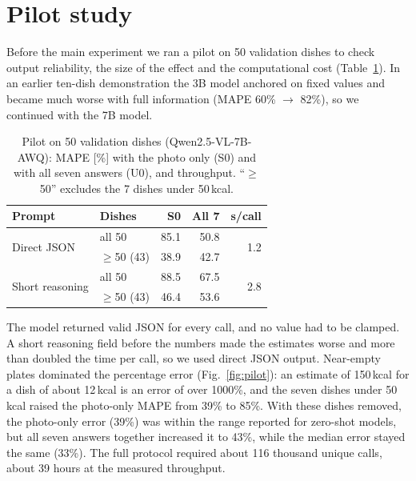 \documentclass[twocolumn]{svjour3}
\begin{document}
\section{Pilot study}
\label{sec:pilot}

Before the main experiment we ran a pilot on 50 validation dishes to check output reliability, the size of
the effect and the computational cost (Table~\ref{tab:pilot}). In an earlier ten-dish demonstration the
3B model anchored on fixed values and became much worse with full information (MAPE 60\% $\rightarrow$ 82\%),
so we continued with the 7B model.

\begin{table}[t]
  \centering
  \caption{Pilot on 50 validation dishes (Qwen2.5-VL-7B-AWQ): MAPE [\%] with the photo only (S0) and with
  all seven answers (U0), and throughput. ``$\ge$50'' excludes the 7 dishes under 50\,kcal.}
  \label{tab:pilot}
  \setlength{\tabcolsep}{3.5pt}
  \begin{tabular}{@{}llrrr@{}}
    \toprule
    Prompt & Dishes & S0 & All 7 & s/call \\
    \midrule
    \multirow{2}{*}{Direct JSON}      & all 50     & 85.1 & 50.8 & \multirow{2}{*}{1.2} \\
                                      & $\ge$50 (43) & 38.9 & 42.7 & \\
    \midrule
    \multirow{2}{*}{Short reasoning}  & all 50     & 88.5 & 67.5 & \multirow{2}{*}{2.8} \\
                                      & $\ge$50 (43) & 46.4 & 53.6 & \\
    \bottomrule
  \end{tabular}
\end{table}

The model returned valid JSON for every call, and no value had to be clamped. A short reasoning field
before the numbers made the estimates worse and more than doubled the time per call, so we used direct
JSON output. Near-empty plates dominated the percentage error (Fig.~\ref{fig:pilot}): an estimate of 150\,kcal for
a dish of about 12\,kcal is an error of over 1000\%, and the seven dishes under
50\,kcal raised the photo-only MAPE from 39\% to 85\%. With these dishes removed, the photo-only error
(39\%) was within the range reported for zero-shot models, but all seven answers together increased it to
43\%, while the median error stayed the same (33\%). The full protocol required about 116 thousand
unique calls, about 39 hours at the measured throughput.
\end{document}
